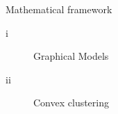 \documentclass[11pt]{beamer}
\newcommand{\prune}[1]{\textcolor{Framaprunelight}{#1}}
\begin{document}
		
		
		\begin{frame}{}
			\begin{center}
				\Huge{\prune{Mathematical framework}}
			\end{center}
			\normalsize
			\begin{center}
				\begin{description}
					\item[i] {Graphical Models}
					\item[ii]  Convex clustering 
				\end{description}
			\end{center}
			
		\end{frame}
		
\end{document}
